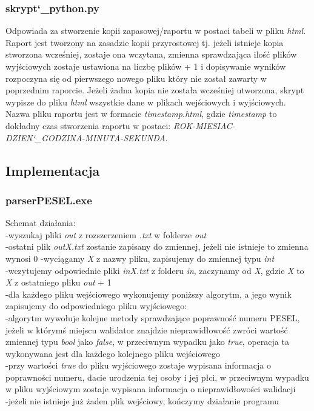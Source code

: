 \documentclass[12pt,a4paper]{article}
\begin{document}
		\subsubsection*{skrypt\char`_python.py}
Odpowiada za stworzenie kopii zapasowej/raportu w postaci tabeli w pliku \textit{html}. Raport jest tworzony na zasadzie kopii przyrostowej tj. jeżeli istnieje kopia stworzona wcześniej, zostaje ona wczytana, zmienna sprawdzająca ilość plików wyjściowych zostaje ustawiona na liczbę plików + 1 i dopisywanie wyników rozpoczyna się od pierwszego nowego pliku który nie został zawarty w poprzednim raporcie. Jeżeli żadna kopia nie została wcześniej utworzona, skrypt wypisze do pliku \textit{html} wszystkie dane w plikach wejściowych i wyjściowych. Nazwa pliku raportu jest w formacie \textit{timestamp.html}, gdzie \textit{timestamp} to dokładny czas stworzenia raportu w postaci: \textit{ROK-MIESIAC-DZIEN\char`_GODZINA-MINUTA-SEKUNDA}.
	\subsection*{Implementacja}
	\subsubsection*{parserPESEL.exe}
Schemat działania:\\
-wyszukaj pliki \textit{out} z rozszerzeniem \textit{.txt} w folderze \textit{out}\\
-ostatni plik \textit{outX.txt} zostanie zapisany do zmiennej, jeżeli nie istnieje to zmienna wynosi 0
-wyciągamy \textit{X} z nazwy pliku, zapisujemy do zmiennej typu \textit{int}\\
-wczytujemy odpowiednie pliki \textit{inX.txt} z folderu \textit{in}, zaczynamy od \textit{X}, gdzie \textit{X} to \textit{X} z ostatniego pliku \textit{out} + 1\\
-dla każdego pliku wejściowego wykonujemy poniższy algorytm, a jego wynik zapisujemy do odpowiedniego pliku wyjściowego:\\
-algorytm wywołuje kolejne metody sprawdzające poprawność numeru PESEL, jeżeli w którymś miejscu walidator znajdzie nieprawidłowość zwróci wartość zmiennej typu \textit{bool} jako \textit{false}, w przeciwnym wypadku jako \textit{true}, operacja ta wykonywana jest dla każdego kolejnego pliku wejściowego\\
-przy wartości \textit{true} do pliku wyjściowego zostaje wypisana informacja o poprawności numeru, dacie urodzenia tej osoby i jej płci, w przeciwnym wypadku w pliku wyjściowym zostaje wypisana informacja o nieprawidłowości walidacji\\
-jeżeli nie istnieje już żaden plik wejściowy, kończymy działanie programu\\
\end{document}
